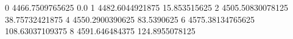 0 4466.7509765625 0.0
1 4482.6044921875 15.853515625
2 4505.50830078125 38.75732421875
4 4550.2900390625 83.5390625
6 4575.38134765625 108.63037109375
8 4591.646484375 124.8955078125
